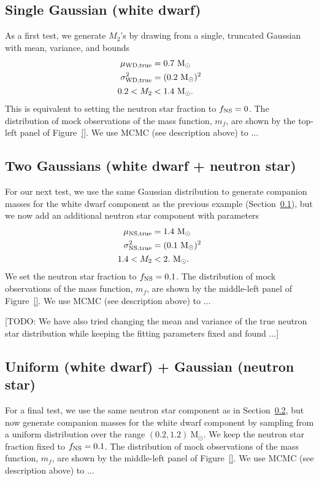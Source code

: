 \documentclass[letterpaper,12pt,preprint]{aastex}
\newcommand{\Msun}{\mathrm{M}_\odot}
\begin{document}
\subsection{Single Gaussian (white dwarf)} \label{sec:exp1}

As a first test, we generate $M_2$'s by drawing from a single, truncated Gaussian with mean, variance, and bounds
\begin{align}
	\mu_{\rm WD, true} &= 0.7~\Msun\\
	\sigma^2_{\rm WD, true} &= (0.2~\Msun)^2\\
	0.2 < M_2& < 1.4~\Msun.
\end{align}
This is equivalent to setting the neutron star fraction to $f_{\rm NS} = 0$. The distribution of mock observations of the mass function, $m_f$, are shown by the top-left panel of Figure~\ref{}. We use MCMC (see description above) to ... 

\subsection{Two Gaussians (white dwarf + neutron star)} \label{sec:exp2}
For our next test, we use the same Gaussian distribution to generate companion masses for the white dwarf component as the previous example (Section~\ref{sec:exp1}), but we now add an additional neutron star component with parameters
\begin{align}
	\mu_{\rm NS, true} &= 1.4~\Msun\\
	\sigma^2_{\rm NS, true} &= (0.1~\Msun)^2\\
	1.4 < M_2& < 2.~\Msun.
\end{align}
We set the neutron star fraction to $f_{\rm NS} = 0.1$. The distribution of mock observations of the mass function, $m_f$, are shown by the middle-left panel of Figure~\ref{}. We use MCMC (see description above) to ...

[TODO: We have also tried changing the mean and variance of the true neutron star distribution while keeping the fitting parameters fixed and found ...]

\subsection{Uniform (white dwarf) + Gaussian (neutron star)} \label{sec:exp3}
For a final test, we use the same neutron star component as in Section~\ref{sec:exp2}, but now generate companion masses for the white dwarf component by sampling from a uniform distribution over the range $(0.2,1.2)~\Msun$. We keep the neutron star fraction fixed to $f_{\rm NS}=0.1$. The distribution of mock observations of the mass function, $m_f$, are shown by the middle-left panel of Figure~\ref{}. We use MCMC (see description above) to ...
\end{document}
